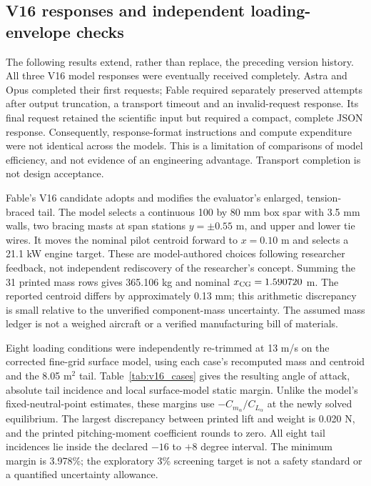 \documentclass[10pt,letterpaper]{article}
\begin{document}
\subsection{V16 responses and independent loading-envelope checks}
\label{sec:v16_update}
The following results extend, rather than replace, the preceding version history.
All three V16 model responses were eventually received completely. Astra and Opus
completed their first requests; Fable required separately preserved attempts after
output truncation, a transport timeout and an invalid-request response. Its final
request retained the scientific input but required a compact, complete JSON response.
Consequently, response-format instructions and compute expenditure were not identical
across the models. This is a limitation of comparisons of model efficiency, and not
evidence of an engineering advantage. Transport completion is not design acceptance.

Fable's V16 candidate adopts and modifies the evaluator's enlarged, tension-braced
tail. The model selects a continuous 100 by 80 mm box spar with 3.5 mm walls, two
bracing masts at span stations $y=\pm0.55$ m, and upper and lower tie wires. It moves
the nominal pilot centroid forward to $x=0.10$ m and selects a 21.1 kW engine target.
These are model-authored choices following researcher feedback, not independent
rediscovery of the researcher's concept. Summing the 31 printed mass rows gives
365.106 kg and nominal $x_{\rm CG}=1.590720$ m. The reported centroid differs by
approximately 0.13 mm; this arithmetic discrepancy is small relative to the
unverified component-mass uncertainty. The assumed mass ledger is not a weighed
aircraft or a verified manufacturing bill of materials.

Eight loading conditions were independently re-trimmed at 13 m/s on the corrected
fine-grid surface model, using each case's recomputed mass and centroid and the
8.05 m$^2$ tail. Table~\ref{tab:v16_cases} gives the resulting angle of attack,
absolute tail incidence and local surface-model static margin. Unlike the model's
fixed-neutral-point estimates, these margins use $-C_{m_\alpha}/C_{L_\alpha}$ at
the newly solved equilibrium. The largest discrepancy between printed lift and
weight is 0.020 N, and the printed pitching-moment coefficient rounds to zero.
All eight tail incidences lie inside the declared $-16$ to $+8$ degree interval.
The minimum margin is 3.978\%; the exploratory 3\% screening target is not a safety
standard or a quantified uncertainty allowance.
\end{document}
